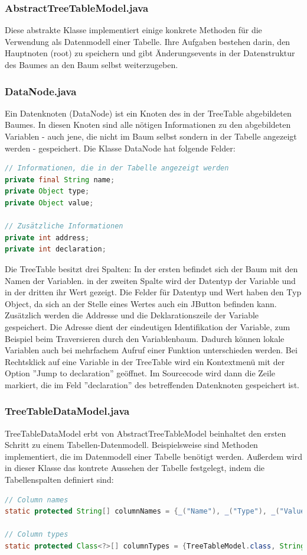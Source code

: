 \subsubsection*{AbstractTreeTableModel.java}
Diese abstrakte Klasse implementiert einige konkrete Methoden für die Verwendung als Datenmodell einer Tabelle. Ihre Aufgaben bestehen darin, den Hauptnoten (root) zu speichern und gibt Änderungsevents in der Datenstruktur des Baumes an den Baum selbst weiterzugeben.

\subsubsection*{DataNode.java}
Ein Datenknoten (DataNode) ist ein Knoten des in der TreeTable abgebildeten Baumes. In diesen Knoten sind alle nötigen Informationen zu den abgebildeten Variablen - auch jene, die nicht im Baum selbst sondern in der Tabelle angezeigt werden - gespeichert.
\newline
Die Klasse DataNode hat folgende Felder:
\begin{lstlisting}[language=JAVA]
// Informationen, die in der Tabelle angezeigt werden
private final String name;
private Object type;
private Object value;

// Zusätzliche Informationen
private int address;
private int declaration;
\end{lstlisting}
Die TreeTable besitzt drei Spalten: In der ersten befindet sich der Baum mit den Namen der Variablen. in der zweiten Spalte wird der Datentyp der Variable und in der dritten ihr Wert gezeigt. Die Felder für Datentyp und Wert haben den Typ Object, da sich an der Stelle eines Wertes auch ein JButton befinden kann.
\newline
Zusätzlich werden die Addresse und die Deklarationszeile der Variable gespeichert. Die Adresse dient der eindeutigen Identifikation der Variable, zum Beispiel beim Traversieren durch den Variablenbaum. Dadurch können lokale Variablen auch bei mehrfachem Aufruf einer Funktion unterschieden werden.
\newline
Bei Rechtsklick auf eine Variable in der TreeTable wird ein Kontextmenü mit der Option ''Jump to declaration'' geöffnet. Im Sourcecode wird dann die Zeile markiert, die im Feld ''declaration'' des betreffenden Datenknoten gespeichert ist.

\subsubsection*{TreeTableDataModel.java}
TreeTableDataModel erbt von AbstractTreeTableModel beinhaltet den ersten Schritt zu einem Tabellen-Datenmodell. Beispielsweise sind Methoden implementiert, die im Datenmodell einer Tabelle benötigt werden. Außerdem wird in dieser Klasse das kontrete Aussehen der Tabelle festgelegt, indem die Tabellenspalten definiert sind:
\begin{lstlisting}[language=JAVA]
// Column names
static protected String[] columnNames = {_("Name"), _("Type"), _("Value")};
 
// Column types
static protected Class<?>[] columnTypes = {TreeTableModel.class, String.class, Object.class};
\end{lstlisting}

